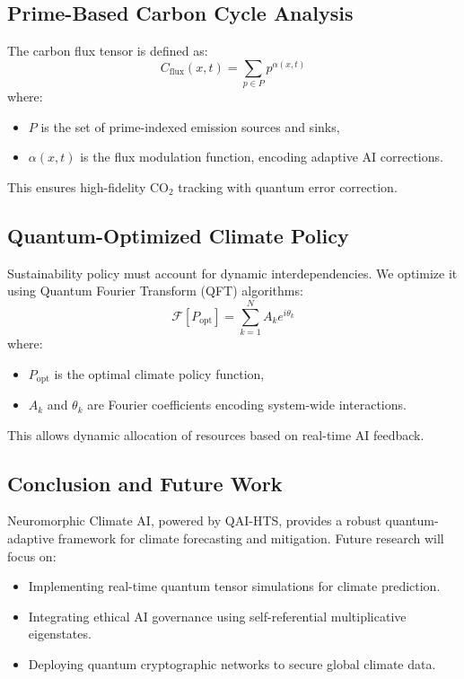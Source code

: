 \documentclass{article}
\theoremstyle{plain}
\begin{document}
\begin{itemize}
\begin{itemize}
\subsection{Prime-Based Carbon Cycle Analysis}
The carbon flux tensor is defined as:
\begin{equation}
    C_{\text{flux}}(x,t) = \sum_{p \in P} p^{\alpha(x,t)}
\end{equation}
where:
\begin{itemize}
    \item \( P \) is the set of prime-indexed emission sources and sinks,
    \item \( \alpha(x,t) \) is the flux modulation function, encoding adaptive AI corrections.
\end{itemize}
This ensures high-fidelity CO$_2$ tracking with quantum error correction.

\subsection{Quantum-Optimized Climate Policy}
Sustainability policy must account for dynamic interdependencies. We optimize it using Quantum Fourier Transform (QFT) algorithms:
\begin{equation}
    \mathcal{F}[P_{\text{opt}}] = \sum_{k=1}^{N} A_k e^{i\theta_k}
\end{equation}
where:
\begin{itemize}
    \item \( P_{\text{opt}} \) is the optimal climate policy function,
    \item \( A_k \) and \( \theta_k \) are Fourier coefficients encoding system-wide interactions.
\end{itemize}
This allows dynamic allocation of resources based on real-time AI feedback.

\subsection{Conclusion and Future Work}
Neuromorphic Climate AI, powered by QAI-HTS, provides a robust quantum-adaptive framework for climate forecasting and mitigation. Future research will focus on:
\begin{itemize}
    \item Implementing real-time quantum tensor simulations for climate prediction.
    \item Integrating ethical AI governance using self-referential multiplicative eigenstates.
    \item Deploying quantum cryptographic networks to secure global climate data.
\end{itemize}



\end{itemize}
\end{itemize}
\end{document}

